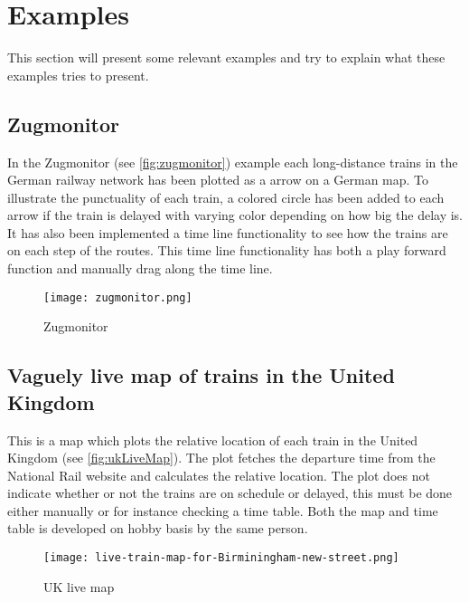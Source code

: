 \section{Examples}
\label{sect:backgroundExamples}
This section will present some relevant examples and try to explain what these
examples tries to present.
\subsection{Zugmonitor}
\label{sub:subsection_zugmonitor}

In the Zugmonitor (see \vref{fig:zugmonitor}) example each long-distance 
trains in the German railway network has been plotted as a arrow on a German 
map. To illustrate the punctuality of each train, a colored circle has been 
added to each arrow if the train is delayed with varying color depending on 
how big the delay is. It has also been implemented a time line functionality 
to see how the trains are on each step of the routes. This time line 
functionality has both a play forward function and manually drag along the 
time line.

\begin{figure}[!htbp]
	\texttt{[image: zugmonitor.png]}
	\caption[Zugmonitor]{Zugmonitor \cite{zugmonitor}}
	\label{fig:zugmonitor}
\end{figure}
\pagebreak

\clearpage
\subsection{Vaguely live map of trains in the United Kingdom}
\label{sub:subsection_ukLiveMap}

This is a map which plots the relative location of each train in the United
Kingdom (see \vref{fig:ukLiveMap}). The plot fetches the departure time from the 
National Rail website and calculates the relative location. The plot does not
indicate whether or not the trains are on schedule or delayed, this must be
done either manually or for instance checking a time table\cite{trainTimesUK}.
Both the map and time table is developed on hobby basis by the same person. 

\begin{figure}[!htbp]
	\texttt{[image: live-train-map-for-Birminingham-new-street.png]}
	\caption[UK live map]{UK live map \cite{ukLiveMap}}
	\label{fig:ukLiveMap}
\end{figure}
\pagebreak

